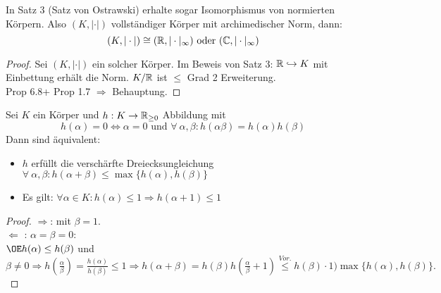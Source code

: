 
\begin{Kor}
In Satz 3 (Satz von Ostrawski) erhalte sogar Isomorphismus von normierten Körpern. Also $(K, |\cdot|)$ vollständiger Körper mit archimedischer Norm, dann:
\[ (K,|\cdot|) \cong (\mathbb{R}, |\cdot|_\infty) \text{ oder } (\mathbb{C}, |\cdot|_\infty)\]
\end{Kor}

\begin{proof}
Sei $(K,|\cdot|)$ ein solcher Körper. Im Beweis von Satz 3: $\mathbb{R} \hookrightarrow K$ mit Einbettung erhält die Norm. $K/ \mathbb{R}$ ist $\leq$ Grad 2 Erweiterung.\\
Prop 6.8+ Prop 1.7 $\Rightarrow$ Behauptung.
\end{proof}

\begin{Lem}
Sei $K$ ein Körper und $h: K \to \mathbb{R}_{\geq 0}$ Abbildung mit
\[h(\alpha) = 0 \iff \alpha = 0 \text{ und } \forall \ \alpha,\beta: h(\alpha \beta) = h(\alpha)h(\beta)\]
Dann sind äquivalent:
\begin{itemize}
\item $h$ erfüllt die verschärfte Dreiecksungleichung $\forall\ \alpha, \beta: h(\alpha+\beta) \leq \max\{h(\alpha), h(\beta)\}$
\item Es gilt: $\forall \alpha \in K: h(\alpha) \leq 1 \Rightarrow h(\alpha+1) \leq 1$
\end{itemize}
\end{Lem}

\begin{proof}
\glqq $\Rightarrow$\grqq : mit $\beta=1$.\\
\glqq $\Leftarrow$ \grqq : $\alpha=\beta=0$: \checkmark\\
$\OE h(\alpha) \leq h(\beta)$ und $\beta \neq 0 \Rightarrow h(\frac{\alpha}{\beta})=\frac{h(\alpha)}{h(\beta)} \leq 1 \Rightarrow h(\alpha+\beta)=h(\beta)h(\frac{\alpha}{\beta}+1)\stackrel{Vor.}{\leq} h(\beta)\cdot 1 ) \max \{h(\alpha), h(\beta)\}.$
\end{proof}

